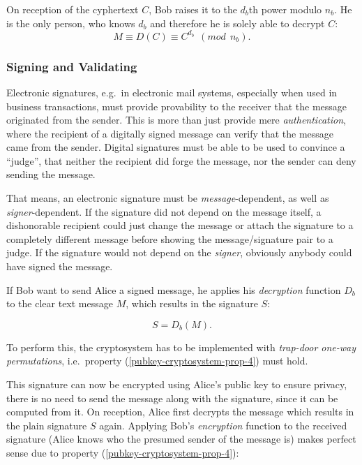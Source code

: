 On reception  of the cyphertext  $C$, Bob raises  it to the  $d_b$th power
modulo $n_b$. He  is the only person, who knows $d_b$  and therefore he is
solely able to decrypt $C$:
\begin{equation*}
  \label{eq:decrypt-message}
  M \equiv D(C) \equiv C^{d_b}\ \ (mod\ \ n_b).
\end{equation*}

\subsubsection{Signing and Validating}

Electronic  signatures, e.g.~in electronic  mail systems,  especially when
used in  business transactions, must  provide provability to  the receiver
that  the message  originated from  the sender.   This is  more  than just
provide  mere \emph{authentication},  where the  recipient of  a digitally
signed message can  verify that the message came  from the sender. Digital
signatures must be  able to be used to convince  a ``judge'', that neither
the recipient did  forge the message, nor the sender  can deny sending the
message.

That means,  an electronic signature must  be \emph{message}-dependent, as
well as  \emph{signer}-dependent. If the  signature did not depend  on the
message itself, a dishonorable recipient  could just change the message or
attach the signature to a  completely different message before showing the
message/signature pair  to a judge. If  the signature would  not depend on
the \emph{signer}, obviously anybody could have signed the message.

\medskip

If   Bob  want  to   send  Alice   a  signed   message,  he   applies  his
\emph{decryption}  function $D_b$  to the  clear text  message  $M$, which
results in the signature $S$:

\begin{equation*}
  \label{eq:compute-signature}
  S = D_b(M).
\end{equation*}

To   perform  this,   the  cryptosystem   has  to   be   implemented  with
\emph{trap-door         one-way        permutations},        i.e.~property
(\ref{pubkey-cryptosystem-prop-4}) must hold.

This signature  can now  be encrypted using  Alice's public key  to ensure
privacy, there  is no need to  send the message along  with the signature,
since it can  be computed from it. On reception,  Alice first decrypts the
message which  results in the  plain signature $S$ again.   Applying Bob's
\emph{encryption} function to the  received signature (Alice knows who the
presumed sender  of the  message is) makes  perfect sense due  to property
(\ref{pubkey-cryptosystem-prop-4}):

